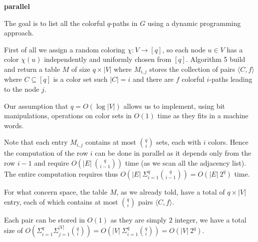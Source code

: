 \begin{algorithm}[h]
		
	\small
	\DontPrintSemicolon
	\BlankLine
	\textbf{parallel} 
	\BlankLine
	\caption{$\textsc{preprocess}$: $\textsc{color-coding}$}
	\label{alg:color-coding}
\end{algorithm}

The goal is to list all the colorful $q$-paths in $G$ using a dynamic programming approach.\medskip

First of all we assign a random coloring $\chi : V \rightarrow [q]$, so each node $u \in V$ has a color $\chi(u)$ independently and uniformly chosen from $[q]$. Algorithm 5 build and return a table $M$ of size $q \times |V|$ where $M_{i,j}$ stores the collection of pairs $\langle C, f \rangle$ where  $C \subseteq [q]$ is a color set such $|C| = i$ and there are $f$ colorful $i$-paths leading to the node $j$.\medskip

Our assumption that $q = O(\log |V|)$ allows us to implement, using bit manipulations, operations on color sets in $O(1)$ time as they fits in a machine words.\medskip

Note that each entry $M_{i, j}$ contains at most $\binom{q}{i}$ sets, each with $i$ colors. Hence the computation of the row $i$ can be done in parallel as it depends only from the row $i-1$ and require $O(|E|\ \binom{q}{i-1})$ time (as we scan all the adjacency list). The entire computation requires thus $O(|E|\ \Sigma_{i=1}^{q}{\binom{q}{i-1}}) = O(|E|\ 2^{q})$ time.\bigskip

For what concern space, the table $M$, as we already told, have a total of $q \times |V|$ entry, each of which contains at most $\binom{q}{i}$ pairs $\langle C, f \rangle$.

Each pair can be stored in $O(1)$ as they are simply $2$ integer, we have a total size of $O(\Sigma_{i=1}^{q}{\Sigma_{j=1}^{|V|}{ \binom{q}{i}}}) = O(|V|\ \Sigma_{i=1}^{q}{\binom{q}{i}}) = O(|V|\ 2^{q})$.\bigskip

